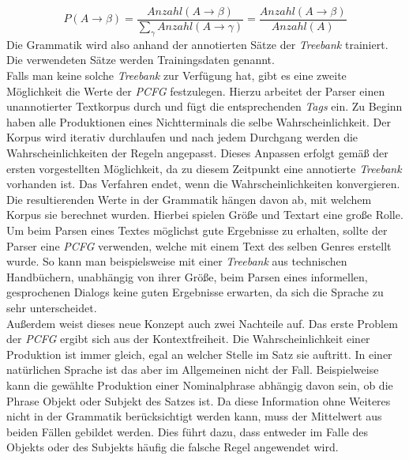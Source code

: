 \begin{equation}
P(A \to \beta) = \frac{Anzahl(A \to \beta)}{ \sum_{\gamma} Anzahl(A \to \gamma)} = \frac{Anzahl(A \to \beta)}{Anzahl(A)}
\end{equation}
Die Grammatik wird also anhand der annotierten Sätze der \textit{Treebank} trainiert. Die verwendeten Sätze werden Trainingsdaten genannt. \\
Falls man keine solche \textit{Treebank} zur Verfügung hat, gibt es eine zweite Möglichkeit die Werte der \textit{PCFG} festzulegen. Hierzu arbeitet der Parser einen unannotierter Textkorpus durch und fügt die entsprechenden \textit{Tags} ein. Zu Beginn haben alle Produktionen eines Nichtterminals die selbe Wahrscheinlichkeit. Der Korpus wird iterativ durchlaufen und nach jedem Durchgang werden die Wahrscheinlichkeiten der Regeln angepasst. Dieses Anpassen erfolgt gemäß der ersten vorgestellten Möglichkeit, da zu diesem Zeitpunkt eine annotierte \textit{Treebank} vorhanden ist. Das Verfahren endet, wenn die Wahrscheinlichkeiten konvergieren. \\
Die resultierenden Werte in der Grammatik hängen davon ab, mit welchem Korpus sie berechnet wurden. Hierbei spielen Größe und Textart eine große Rolle. Um beim Parsen eines Textes möglichst gute Ergebnisse zu erhalten, sollte der Parser eine \textit{PCFG} verwenden, welche mit einem Text des selben Genres erstellt wurde. So kann man beispielsweise mit einer \textit{Treebank} aus technischen Handbüchern, unabhängig von ihrer Größe, beim Parsen eines informellen, gesprochenen Dialogs keine guten Ergebnisse erwarten, da sich die Sprache zu sehr unterscheidet.\\ 
Außerdem weist dieses neue Konzept auch zwei Nachteile auf.
Das erste Problem der \textit{PCFG} ergibt sich aus der Kontextfreiheit. Die Wahrscheinlichkeit einer Produktion ist immer gleich, egal an welcher Stelle im Satz sie auftritt. In einer natürlichen Sprache ist das aber im Allgemeinen nicht der Fall. Beispielweise kann die gewählte Produktion einer Nominalphrase abhängig davon sein, ob die Phrase Objekt oder Subjekt des Satzes ist. Da diese Information ohne Weiteres nicht in der Grammatik berücksichtigt werden kann, muss der Mittelwert aus beiden Fällen gebildet werden. Dies führt dazu, dass entweder im Falle des Objekts oder des Subjekts häufig die falsche Regel angewendet wird. \\

